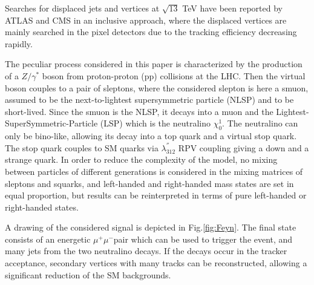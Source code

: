 \documentclass{cernatlasnote}
\newcommand{\mumu}{\ensuremath{\mu^{+}\mu^{-}}}
\begin{document}
 Searches for displaced jets and vertices at $\sqrt{13}$ TeV have been reported by ATLAS \cite{ATLAS-CONF-2018-003} \cite{DISJETSATLAS} and CMS \cite{DISJETSCMS} in an inclusive approach, where the displaced vertices are mainly searched in the pixel detectors due to the tracking efficiency decreasing rapidly. 

The peculiar process considered in this paper is characterized by the production of a $Z/\gamma^*$ boson from proton-proton (pp) collisions at the LHC. Then the virtual boson couples to a pair of sleptons, where the considered slepton is here a smuon, assumed to be the next-to-lightest supersymmetric particle (NLSP) and to be short-lived. Since the smuon is the NLSP, it decays into a muon and the Lightest-SuperSymmetric-Particle (LSP) which is the neutralino $\chi^{1}_{0}$. The neutralino can only be bino-like, allowing its decay into a top quark and a virtual stop quark. The stop quark couples to SM quarks via $\lambda^{''}_{312}$ RPV coupling giving a down and a strange quark.
In order to reduce the complexity of the model, no mixing between particles of different generations is considered in the mixing matrices of sleptons and squarks, and left-handed and right-handed mass states are set in equal proportion, but results can be reinterpreted in terms of pure left-handed or right-handed states.

A drawing of the considered signal is depicted in Fig.\ref{fig:Feyn}.
The final state consists of an energetic \mumu pair which can be used to trigger the event, and many jets from the two neutralino decays. If the decays occur in the tracker acceptance, secondary vertices with many tracks can be reconstructed, allowing a significant reduction of the SM backgrounds.
\end{document}
